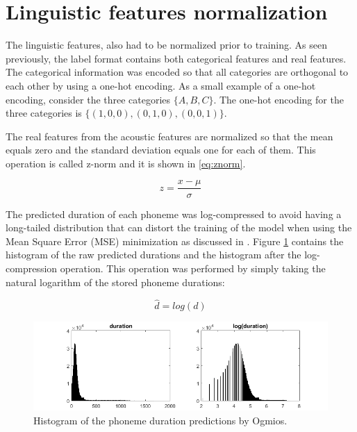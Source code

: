 \section{Linguistic features normalization}

The linguistic features, also had to be normalized prior to training. As seen previously, the label format contains both categorical features and real features. The categorical information was encoded so that all categories are orthogonal to each other by using a one-hot encoding. As a small example of a one-hot encoding, consider the three categories $\{A, B, C\}$. The  one-hot encoding for the three categories is $\{(1,0,0), (0,1,0), (0,0,1)\}$.

The real features from the acoustic features are normalized so that the mean equals zero and the standard deviation equals one for each of them. This operation is called z-norm and it is shown in \ref{eq:znorm}.

\begin{equation}
    z = \frac{x - \mu}{\sigma}
    \label{eq:znorm}
\end{equation}

The predicted duration of each phoneme was log-compressed to avoid having a long-tailed distribution that can distort the training of the model when using the Mean Square Error (MSE) minimization as discussed in \cite{pascual2016deep}. Figure \ref{fig:hist-d} contains the histogram of the raw predicted durations and the histogram after the log-compression operation. This operation was performed by simply taking the natural logarithm of the stored phoneme durations:

\begin{equation}
    \hat{d} = log(d)
\end{equation}

\begin{figure}[h]
    \centering
    \includegraphics[width=14cm]{figures/dur}
    \caption{Histogram of the phoneme duration predictions by Ogmios.}
    \label{fig:hist-d}
\end{figure}

